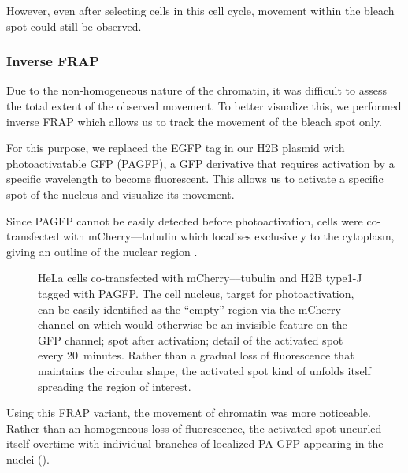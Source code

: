       However, even after selecting cells in this cell cycle, movement within
      the bleach spot could still be observed.

    \subsubsection{Inverse FRAP}

      Due to the non-homogeneous nature of the chromatin, it was difficult
      to assess the total extent of the observed movement. To
      better visualize this, we performed inverse FRAP which allows us
      to track the movement of the bleach spot only.

      For this purpose, we replaced the EGFP tag in our H2B plasmid
      with photoactivatable GFP (PAGFP), a GFP derivative that requires
      activation by a specific wavelength to become fluorescent. This
      allows us to activate a specific spot of the nucleus and visualize
      its movement.

      Since PAGFP cannot be easily detected before photoactivation, cells
      were co-transfected with mCherry--\textalpha--tubulin which localises
      exclusively to the cytoplasm, giving an outline of the nuclear region
      .

      \begin{figure}
        \centering
        \hfill
          {
            HeLa cells co-transfected with mCherry--\textalpha--tubulin and
            H2B type1-J tagged with PAGFP.
             The cell nucleus, target
            for photoactivation, can be easily identified as the ``empty''
            region via the mCherry channel on which would otherwise be an
            invisible feature on the GFP channel;
             spot after activation;
             detail of the
            activated spot every 20~minutes. Rather than a gradual loss of
            fluorescence that maintains the circular shape, the activated spot
            kind of unfolds itself spreading the region of interest.
          }
        \label{fig:kill-frap:ifrap}
      \end{figure}

      Using this FRAP variant, the movement of chromatin was more noticeable.
      Rather than an homogeneous loss of fluorescence, the activated
      spot uncurled itself overtime with individual branches of
      localized PA-GFP appearing in the nuclei ().

